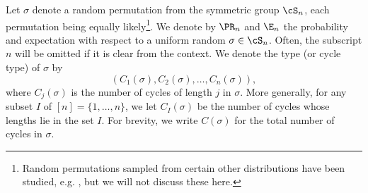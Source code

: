Let $\sigma$ denote a random permutation from
the symmetric group $\cS_n$, each permutation being equally
likely\footnote{Random permutations sampled
from certain other distributions have been studied, e.g. \cite{ABTbook}, but we will not discuss these here.}.
We denote by $\PR_n$ and $\E_n$ the probability and expectation
with respect to a uniform random $\sigma\in \cS_n$.
Often, the subscript $n$ will be omitted if it is clear from the context.
We denote the type (or cycle type) of $\sigma$ by
\[
(C_1(\sigma), C_2(\sigma),\ldots, C_n(\sigma)),
\]
where
$C_j(\sigma)$ is the number of cycles of length $j$ in $\sigma$.
More generally, for any subset $I$ of $[n]=\{1,\ldots,n\}$, we let $C_I(\sigma)$
be the number of cycles whose lengths lie in the set $I$.
For brevity, we write $C(\sigma)$ for the total number of
cycles in $\sigma$.
